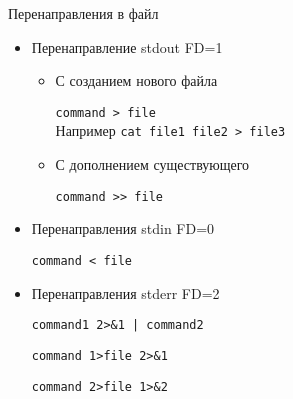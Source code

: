 \begin{frame}{Перенаправления в файл}

\begin{itemize}
  \item Перенаправление stdout FD=1
    \begin{itemize}
      \item С созданием нового файла

        {\tt command > file}\\
		Например {\tt cat file1 file2 > file3}
      \item С дополнением существующего

		  {\tt command >\phantom{}>  file}
    \end{itemize}
    \pause
  \item Перенаправления stdin FD=0

    {\tt command < file}
    \pause
  \item Перенаправления stderr FD=2

    {\tt command1 2>\&1 | command2}

   {\tt command 1>file 2>\&1}

   {\tt command 2>file 1>\&2}
\end{itemize}

\end{frame}
